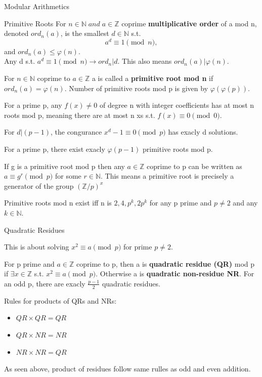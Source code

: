 \documentclass[12pt, letterpaper]{article}
\begin{document}
\begin{section}{Modular Arithmetics}
\begin{subsection}{Primitive Roots}
    For \(n \in \mathbb{N} \; and \; a \in \mathbb{Z}\) coprime
    \textbf{multiplicative order} of a mod n, denoted \(ord_{n}(a)\), is the
    smallest \(d \in \mathbb{N}\) s.t. \[a^{d} \equiv 1 \pmod{n},\] and
    \(ord_{n}(a) \leq \varphi(n)\). \\
    Any d s.t. \(a^{d} \equiv 1 \pmod{n} \to ord_{n} | d\). This also means
    \(ord_{n}(a) | \varphi(n)\).

    For \(n \in \mathbb{N}\) coprime to \(a \in \mathbb{Z}\) a is called a
    \textbf{primitive root mod n} if \(ord_{n}(a) = \varphi(n)\). Number of primitive
    roots mod p is given by \(\varphi(\varphi(p))\).

    For a prime p, any \(f(x) \neq 0\) of degree n with integer coefficients has
    at most n roots mod p, meaning there are at most n xs s.t. \(f(x) \equiv 0 \pmod{0}\).

    For \(d | (p - 1)\), the congurance \(x^{d} - 1 \equiv 0 \pmod{p}\) has
    exacly d solutions.

    For a prime p, there exist exacly \(\varphi(p - 1)\) primitive roots mod p.

    If g is a primitive root mod p then any \(a \in \mathbb{Z}\) coprime to p
    can be written as \(a \equiv g^{r} \pmod{p}\) for some \(r \in \mathbb{N}\).
    This means a primitive root is precisely a generator of the group \((\mathbb{Z} / p)^{x}\)

    Primitive roots mod n exist iff n is \(2, 4, p^{k}, 2p^{k}\) for any p prime
    and \(p \neq 2\) and any \(k \in \mathbb{N}\).

  \end{subsection}

  \begin{subsection}{Quadratic Residues}

    This is about solving \(x^{2} \equiv a \pmod{p}\) for prime \(p \neq 2\).

    For p prime and \(a \in \mathbb{Z}\) coprime to p, then a is \textbf{quadratic
      residue (QR)} mod p if \(\exists x \in \mathbb{Z}\) s.t.
    \(x^{2} \equiv a \pmod{p}\). Otherwise a is \textbf{quadratic non-residue NR}.
    For an odd p, there are exacly \(\frac{p - 1}{2}\) quadratic residues.

    Rules for products of QRs and NRs:
    \begin{itemize}
      \item \(QR \times QR = QR\)
      \item \(QR \times NR = NR\)
      \item \(NR \times NR = QR\)
    \end{itemize}
    As seen above, product of residues follow same rulles as
    odd and even addition.


\end{subsection}
\end{section}
\end{document}
